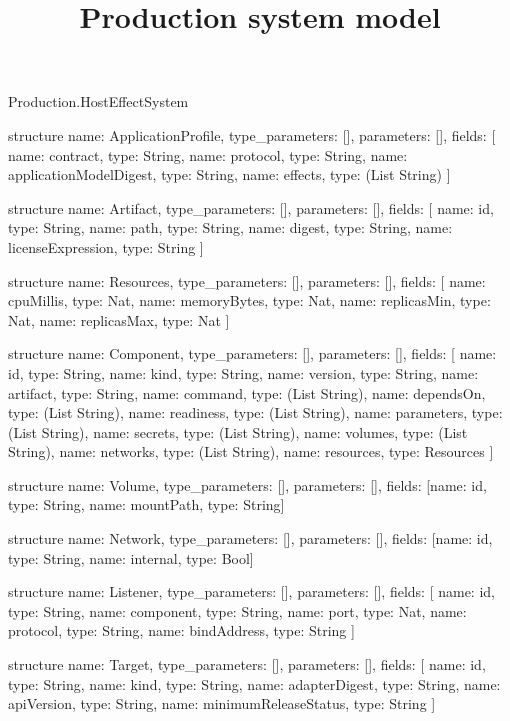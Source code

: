 \begin{lexlean}{Production.HostEffectSystem}
\title{Production system model}
\begin{semanticmodule}
structure{
  name: ApplicationProfile,
  type_parameters: [],
  parameters: [],
  fields: [
    {name: contract, type: String},
    {name: protocol, type: String},
    {name: applicationModelDigest, type: String},
    {name: effects, type: (List String)}
  ]
}

structure{
  name: Artifact,
  type_parameters: [],
  parameters: [],
  fields: [
    {name: id, type: String},
    {name: path, type: String},
    {name: digest, type: String},
    {name: licenseExpression, type: String}
  ]
}

structure{
  name: Resources,
  type_parameters: [],
  parameters: [],
  fields: [
    {name: cpuMillis, type: Nat},
    {name: memoryBytes, type: Nat},
    {name: replicasMin, type: Nat},
    {name: replicasMax, type: Nat}
  ]
}

structure{
  name: Component,
  type_parameters: [],
  parameters: [],
  fields: [
    {name: id, type: String},
    {name: kind, type: String},
    {name: version, type: String},
    {name: artifact, type: String},
    {name: command, type: (List String)},
    {name: dependsOn, type: (List String)},
    {name: readiness, type: (List String)},
    {name: parameters, type: (List String)},
    {name: secrets, type: (List String)},
    {name: volumes, type: (List String)},
    {name: networks, type: (List String)},
    {name: resources, type: Resources}
  ]
}

structure{
  name: Volume,
  type_parameters: [],
  parameters: [],
  fields: [{name: id, type: String}, {name: mountPath, type: String}]
}

structure{
  name: Network,
  type_parameters: [],
  parameters: [],
  fields: [{name: id, type: String}, {name: internal, type: Bool}]
}

structure{
  name: Listener,
  type_parameters: [],
  parameters: [],
  fields: [
    {name: id, type: String},
    {name: component, type: String},
    {name: port, type: Nat},
    {name: protocol, type: String},
    {name: bindAddress, type: String}
  ]
}

structure{
  name: Target,
  type_parameters: [],
  parameters: [],
  fields: [
    {name: id, type: String},
    {name: kind, type: String},
    {name: adapterDigest, type: String},
    {name: apiVersion, type: String},
    {name: minimumReleaseStatus, type: String}
  ]
}


\end{semanticmodule}
\end{lexlean}
